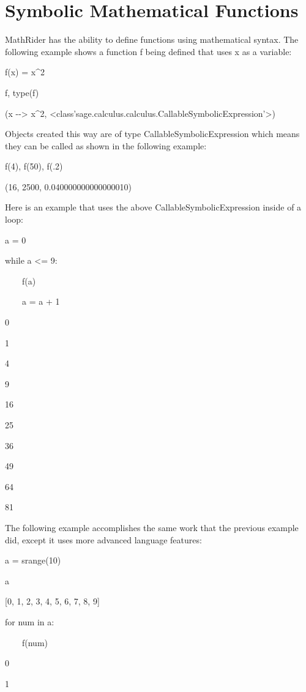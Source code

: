 \documentclass[12pt,oneside]{book}
\begin{document}
\section[Symbolic Mathematical Functions]{ Symbolic Mathematical Functions}

MathRider has the ability to define functions using mathematical syntax. The following example shows a function f being defined that uses x as a variable: 

f(x) = x\^{}2

f, type(f)

{\textbar}

(x {\textbar}{}-{}-{\textgreater} x\^{}2, {\textless}class'sage.calculus.calculus.CallableSymbolicExpression'{\textgreater})

Objects created this way are of type CallableSymbolicExpression which means they can be called as shown in the following example: 

f(4), f(50), f(.2)

{\textbar}

(16, 2500, 0.040000000000000010)

Here is an example that uses the above CallableSymbolicExpression inside of a loop: 

a = 0

while a {\textless}= 9:

\ \ \ \ f(a)

\ \ \ \ a = a + 1

{\textbar}

0

1

4

9

16

25

36

49

64

81


The following example accomplishes the same work that the previous example did, except it uses more advanced language features: 

a = srange(10)

a

{\textbar}

[0, 1, 2, 3, 4, 5, 6, 7, 8, 9]


for num in a:

\ \ \ \ f(num)

{\textbar}

0

1
\end{document}
